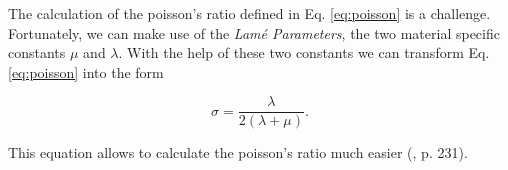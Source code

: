 The calculation of the poisson's ratio defined in Eq. \ref{eq:poisson} is a challenge. Fortunately, we can make use of the \textit{Lamé Parameters}, the two material specific constants $\mu$ and $\lambda$. With the help of these two constants we can transform Eq. \ref{eq:poisson} into the form

\begin{equation}\label{eq:poisson_ratio}
\sigma =  \frac{\lambda}{2(\lambda + \mu)}.
\end{equation}

This equation allows to calculate the poisson's ratio much easier (\cite{BERGSTROM2015209}, p. 231). 







